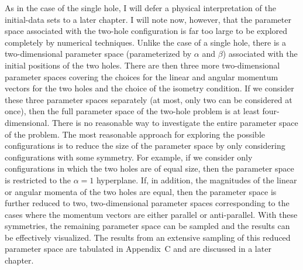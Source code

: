 As in the case of the single hole, I will defer a physical interpretation of the
initial-data sets to a later chapter.  I will note now, however, that the
parameter space associated with the two-hole configuration is far too large to be
explored completely by numerical techniques.  Unlike the case of a single hole,
there is a two-dimensional parameter space (parameterized by $\alpha$ and
$\beta$) associated with the initial positions of the two holes.  There are then
three more two-dimensional parameter spaces covering the choices for the linear
and angular momentum vectors for the two holes and the choice of the isometry
condition.  If we consider these three parameter spaces separately (at most,
only two can be considered at once), then the full parameter space of the
two-hole problem is at least four-dimensional.  There is no reasonable way to
investigate the entire parameter space of the problem.  The most reasonable
approach for exploring the possible configurations is to reduce the size of the
parameter space by only considering configurations with some symmetry.  For
example, if we consider only configurations in which the two holes are of equal
size, then the parameter space is restricted to the $\alpha=1$ hyperplane.  If,
in addition, the magnitudes of the linear or angular momenta of the two holes are
equal, then the parameter space is further reduced to two, two-dimensional
parameter spaces corresponding to the cases where the momentum vectors are
either parallel or anti-parallel.  With these symmetries, the remaining parameter
space can be sampled and the results can be effectively visualized.  The
results from an extensive sampling of this reduced parameter space are
tabulated in Appendix~C and are discussed in a later chapter.

\vfill
\eject
